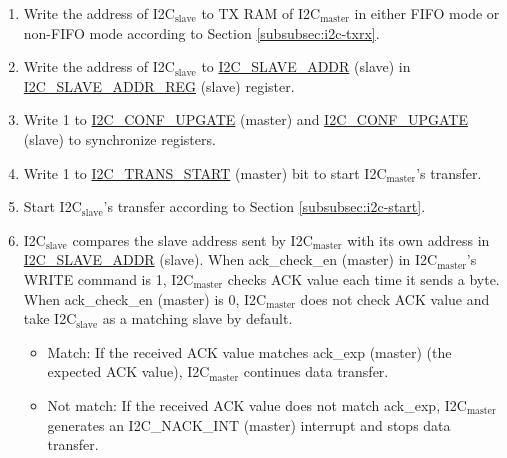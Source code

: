 \documentclass[main\_\_EN.tex]{subfiles}
\begin{document}
\begin{enumerate}
\item Write the address of I2C$_\text{slave}$ to TX RAM of I2C$_\text{master}$ in either FIFO mode or non-FIFO mode according to Section \ref{subsubsec:i2c-txrx}.
\item Write the address of I2C$_\text{slave}$ to \hyperref[fielddesc:I2CSLAVEADDR]{I2C\_SLAVE\_ADDR} (slave) in \hyperref[regdesc:I2CSLAVEADDRREG]{I2C\_SLAVE\_ADDR\_REG} (slave) register.
\item Write 1 to \hyperref[fielddesc:I2CCONFUPGATE]{I2C\_CONF\_UPGATE} (master) and \hyperref[fielddesc:I2CCONFUPGATE]{I2C\_CONF\_UPGATE} (slave) to synchronize registers.
\item Write 1 to \hyperref[fielddesc:I2CTRANSSTART]{I2C\_TRANS\_START} (master) bit to start I2C$_\text{master}$'s transfer.
\item Start I2C$_\text{slave}$'s transfer according to Section \ref{subsubsec:i2c-start}.
\item I2C$_\text{slave}$ compares the slave address sent by I2C$_\text{master}$ with its own address in \hyperref[fielddesc:I2CSLAVEADDR]{I2C\_SLAVE\_ADDR} (slave). When ack\_check\_en (master) in I2C$_\text{master}$'s WRITE command is 1, I2C$_\text{master}$ checks ACK value each time it sends a byte. When ack\_check\_en (master) is 0, I2C$_\text{master}$ does not check ACK value and take I2C$_\text{slave}$ as a matching slave by default.

\begin{itemize}
\item Match: If the received ACK value matches ack\_exp (master) (the expected ACK value), I2C$_\text{master}$ continues data transfer.
\item Not match: If the received ACK value does not match ack\_exp, I2C$_\text{master}$ generates an I2C\_NACK\_INT (master) interrupt and stops data transfer.
\end{itemize}


\end{enumerate}
\end{document}
